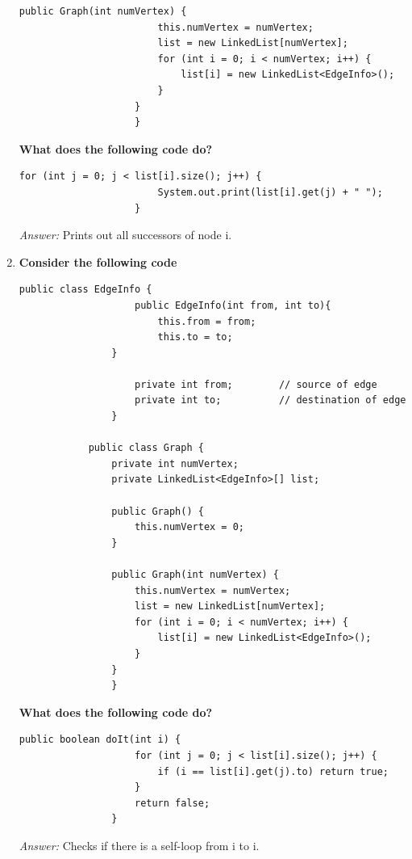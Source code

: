\documentclass[10pt]{article}
\begin{document}
\begin{enumerate}
\begin{lstlisting}[style=java]
                    public Graph(int numVertex) {
                        this.numVertex = numVertex;
                        list = new LinkedList[numVertex];
                        for (int i = 0; i < numVertex; i++) {
                            list[i] = new LinkedList<EdgeInfo>();
                        }
                    }
                    }

                \end{lstlisting}
          \textbf{What does the following code do?}
          \begin{lstlisting}[style=java]
                    for (int j = 0; j < list[i].size(); j++) {
                        System.out.print(list[i].get(j) + " ");
                    }
                \end{lstlisting}
          \textit{Answer:} Prints out all successors of node i.
    \item \textbf{Consider the following code}\\
          \begin{lstlisting}[style=java]
            public class EdgeInfo {
                    public EdgeInfo(int from, int to){
                        this.from = from;
                        this.to = to;
                }

                    private int from;        // source of edge
                    private int to;          // destination of edge
                }

            public class Graph {
                private int numVertex;
                private LinkedList<EdgeInfo>[] list;

                public Graph() {
                    this.numVertex = 0;
                }

                public Graph(int numVertex) {
                    this.numVertex = numVertex;
                    list = new LinkedList[numVertex];
                    for (int i = 0; i < numVertex; i++) {
                        list[i] = new LinkedList<EdgeInfo>();
                    }
                }
                }

            \end{lstlisting}
          \textbf{What does the following code do?}
          \begin{lstlisting}[style=java]
                public boolean doIt(int i) {
                    for (int j = 0; j < list[i].size(); j++) {
                        if (i == list[i].get(j).to) return true;
                    }
                    return false;
                }
            \end{lstlisting}
          \textit{Answer:} Checks if there is a self-loop from i to i.
\end{enumerate}
\newpage
\end{document}
